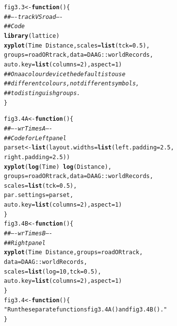 \documentclass[12pt, a4paper,  BCOR=8.25mm, DIV=15]{scrartcl}\usepackage[]{graphicx}\usepackage[]{color}
\makeatletter
\newcommand{\hlnum}[1]{\textcolor[rgb]{0.686,0.059,0.569}{#1}}%
\newcommand{\hlstr}[1]{\textcolor[rgb]{0.192,0.494,0.8}{#1}}%
\newcommand{\hlcom}[1]{\textcolor[rgb]{0.678,0.584,0.686}{\textit{#1}}}%
\newcommand{\hlopt}[1]{\textcolor[rgb]{0,0,0}{#1}}%
\newcommand{\hlstd}[1]{\textcolor[rgb]{0.345,0.345,0.345}{#1}}%
\newcommand{\hlkwa}[1]{\textcolor[rgb]{0.161,0.373,0.58}{\textbf{#1}}}%
\newcommand{\hlkwb}[1]{\textcolor[rgb]{0.69,0.353,0.396}{#1}}%
\newcommand{\hlkwc}[1]{\textcolor[rgb]{0.333,0.667,0.333}{#1}}%
\newcommand{\hlkwd}[1]{\textcolor[rgb]{0.737,0.353,0.396}{\textbf{#1}}}%
\newenvironment{kframe}{%
 \def\at@end@of@kframe{}%
 \ifinner\ifhmode%
  \def\at@end@of@kframe{\end{minipage}}%
  \begin{minipage}{\columnwidth}%
 \fi\fi%
 \def\FrameCommand##1{\hskip\@totalleftmargin \hskip-\fboxsep
 \colorbox{shadecolor}{##1}\hskip-\fboxsep
     \hskip-\linewidth \hskip-\@totalleftmargin \hskip\columnwidth}%
 \MakeFramed {\advance\hsize-\width
   \@totalleftmargin\z@ \linewidth\hsize
   \@setminipage}}%
 {\par\unskip\endMakeFramed%
 \at@end@of@kframe}
\newenvironment{knitrout}{}{} %
\makeatother
\begin{document}
\begin{knitrout}
\color{fgcolor}\begin{kframe}
\begin{alltt}
\hlstd{fig3.3} \hlkwb{<-} \hlkwa{function}\hlstd{()\{}
\hlcom{## ---- trackVSroad ----}
\hlcom{## Code}
\hlkwd{library}\hlstd{(lattice)}
\hlkwd{xyplot}\hlstd{(Time} \hlopt{~} \hlstd{Distance,} \hlkwc{scales}\hlstd{=}\hlkwd{list}\hlstd{(}\hlkwc{tck}\hlstd{=}\hlnum{0.5}\hlstd{),}
       \hlkwc{groups}\hlstd{=roadORtrack,} \hlkwc{data}\hlstd{=DAAG}\hlopt{::}\hlstd{worldRecords,}
       \hlkwc{auto.key}\hlstd{=}\hlkwd{list}\hlstd{(}\hlkwc{columns}\hlstd{=}\hlnum{2}\hlstd{),} \hlkwc{aspect}\hlstd{=}\hlnum{1}\hlstd{)}
\hlcom{## On a a colour device the default is to use}
\hlcom{## different colours, not different symbols,}
\hlcom{## to distinguish groups.}
\hlstd{\}}
\end{alltt}
\end{kframe}
\end{knitrout}

\begin{knitrout}
\color{fgcolor}\begin{kframe}
\begin{alltt}
\hlstd{fig3.4A} \hlkwb{<-} \hlkwa{function}\hlstd{()\{}
\hlcom{## ---- wrTimesA ----}
\hlcom{## Code for Left panel}
\hlstd{parset} \hlkwb{<-} \hlkwd{list}\hlstd{(}\hlkwc{layout.widths}\hlstd{=}\hlkwd{list}\hlstd{(}\hlkwc{left.padding}\hlstd{=}\hlnum{2.5}\hlstd{,}
                                  \hlkwc{right.padding}\hlstd{=}\hlnum{2.5}\hlstd{))}
\hlkwd{xyplot}\hlstd{(}\hlkwd{log}\hlstd{(Time)} \hlopt{~} \hlkwd{log}\hlstd{(Distance),}
       \hlkwc{groups}\hlstd{=roadORtrack,} \hlkwc{data}\hlstd{=DAAG}\hlopt{::}\hlstd{worldRecords,}
       \hlkwc{scales}\hlstd{=}\hlkwd{list}\hlstd{(}\hlkwc{tck}\hlstd{=}\hlnum{0.5}\hlstd{),}
       \hlkwc{par.settings}\hlstd{=parset,}
       \hlkwc{auto.key}\hlstd{=}\hlkwd{list}\hlstd{(}\hlkwc{columns}\hlstd{=}\hlnum{2}\hlstd{),} \hlkwc{aspect}\hlstd{=}\hlnum{1}\hlstd{)}
\hlstd{\}}
\hlstd{fig3.4B} \hlkwb{<-} \hlkwa{function}\hlstd{()\{}
\hlcom{## ---- wrTimesB ----}
\hlcom{## Right panel}
\hlkwd{xyplot}\hlstd{(Time} \hlopt{~} \hlstd{Distance,} \hlkwc{groups}\hlstd{=roadORtrack,}
       \hlkwc{data}\hlstd{=DAAG}\hlopt{::}\hlstd{worldRecords,}
       \hlkwc{scales}\hlstd{=}\hlkwd{list}\hlstd{(}\hlkwc{log}\hlstd{=}\hlnum{10}\hlstd{,} \hlkwc{tck}\hlstd{=}\hlnum{0.5}\hlstd{),}
       \hlkwc{auto.key}\hlstd{=}\hlkwd{list}\hlstd{(}\hlkwc{columns}\hlstd{=}\hlnum{2}\hlstd{),} \hlkwc{aspect}\hlstd{=}\hlnum{1}\hlstd{)}
\hlstd{\}}
\hlstd{fig3.4} \hlkwb{<-} \hlkwa{function}\hlstd{()\{}
\hlstr{"Run the separate functions fig3.4A() and fig3.4B()."}
\hlstd{\}}
\end{alltt}
\end{kframe}
\end{knitrout}
\end{document}
